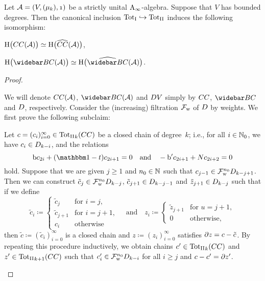 \documentclass[\MainFolder/Text.tex]{subfiles}
\begin{document}
\begin{Lemma} \label{Lem:BddDegrees}
Let $\Alg=(V,(\mu_k),\NOne)$ be a strictly unital $\mathrm{A}_\infty$-algebra. Suppose that $V$ has bounded degrees. Then the canonical inclusion ${\mathrm{Tot}_{\mathrm{I}}} \hookrightarrow {\mathrm{Tot}_{\mathrm{II}}}$ induces the following isomorphism: 
\begin{ClaimList}
\item $\mathrm{H}\bigl(CC(\mathcal{A})\bigr) \simeq \mathrm{H}\bigl(\widehat{CC}(\mathcal{A})\bigr)$,
\item $\H\bigl(\NConCycBi(\Alg)\bigr) \simeq \H\bigl(\widehat{\NConCycBi}(\Alg)\bigr)$.
\end{ClaimList} 
\end{Lemma}
\begin{proof}
\begin{ProofList}
\item We will denote $CC(\mathcal{A})$, $\NConCycBi(\Alg)$ and $D V$ simply by $CC$, $\NConCycBi$ and $D$, respectively. Consider the (increasing) filtration $\mathcal{F}_{\mathrm{w}}$ of $D$ by weights. We first prove the following subclaim:
\begin{SubClaim}\label{SubClaim:LodCycBi}
Let $c = (c_i)_{i=0}^\infty\in {{\mathrm{Tot}_{\mathrm{II}}}}_k(CC)$ be a closed chain of degree~$k$; i.e., for all $i\in\mathbb{N}_0$, we have $c_i \in D_{k-i}$, and the relations
\[ \Hd c_{2i} + (\Id-\CycPermOp)c_{2i+1} = 0 \quad\text{and}\quad -\Hd' c_{2i+1} + \CountOp c_{2i+2} = 0\]
hold. Suppose that we are given $j\ge 1$ and $n_0\in \mathbb{N}$ such that $c_{j-1}\in \mathcal{F}^{n_0}_{\mathrm{w}} D_{k-j+1}$. Then we can construct $\tilde{c}_j\in \mathcal{F}^{n_0}_{\mathrm{w}}D_{k-j}$, $\tilde{c}_{j+1}\in D_{k-j-1}$ and $\tilde{z}_{j+1}\in D_{k-j}$ such that if we define
\begin{equation}\label{Eq:DefOfChains}
\tilde{c}_i \coloneqq \begin{cases}
    \tilde{c}_j & \text{for } i=j, \\
    \tilde{c}_{j+1} & \text{for } i=j+1, \\
    c_i & \text{otherwise}
\end{cases}\quad\text{and}\quad z_i \coloneqq \begin{cases} 
\tilde{z}_{j+1} & \text{for }u = j+ 1,\\
0 & \text{otherwise},
\end{cases}
\end{equation}
then $\tilde{c}\coloneqq (\tilde{c}_i)_{i=0}^\infty$ is a closed chain and $z\coloneqq(z_i)_{i=0}^\infty$ satisfies $\partial z = c - \tilde{c}$. By repeating this procedure inductively, we obtain chains $c'\in{\mathrm{Tot}_{\mathrm{II}}}_k(CC)$ and $z'\in {\mathrm{Tot}_{\mathrm{II}}}_{k+1}(CC)$ such that $c'_i \in \mathcal{F}^{n_0}_{\mathrm{w}}D_{k-i}$ for all $i\ge j$ and $c-c' = \partial z'$.

\end{SubClaim}
\end{ProofList}
\end{proof}
\end{document}
